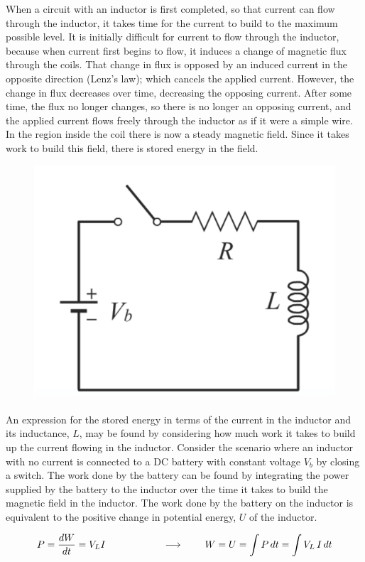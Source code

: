 \documentclass[12pt]{article}
\begin{document}
\begin{flushleft}
When a circuit with an inductor is first completed, so that current can flow through the inductor, it takes time for the current to build to the maximum possible level.  It is initially difficult for current to flow through the inductor, because when current first begins to flow, it induces a change of magnetic flux through the coils.  That change in flux is opposed by an induced current in the opposite direction (Lenz's law); which cancels the applied current.  However, the change in flux decreases over time, decreasing the opposing current.  After some time, the flux no longer changes, so there is no longer an opposing current, and the applied current flows freely through the inductor as if it were a simple wire.  In the region inside the coil there is now a steady magnetic field.  Since it takes work to build this field, there is stored energy in the field.

\begin{figure}[h]
\centering
\includegraphics*[trim=0cm 0cm 0cm 0cm, clip=true, width=0.3\columnwidth]{lrcircuit.png}
\end{figure}

An expression for the stored energy in terms of the current in the inductor and its inductance, $L$, may be found by considering how much work it takes to build up the current flowing in the inductor.  Consider the scenario where an inductor with no current is connected to a DC battery with constant voltage $V_{b}$ by closing a switch.  The work done by the battery can be found by integrating the power supplied by the battery to the inductor over the time it takes to build the magnetic field in the inductor.  The work done by the battery on the inductor is equivalent to the positive change in potential energy, $U$ of the inductor.

\begin{equation}
P = \frac{dW}{dt} =V_{L}I \hspace{.8in} \longrightarrow \hspace{.3in} W=U=\int P\,dt = \int V_{L}\,I\,dt
\label{eq:indpower}
\end{equation}


\end{flushleft}
\end{document}
